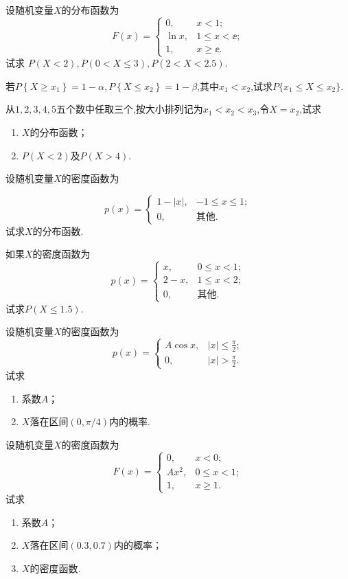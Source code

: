 \begin{xiti}
\item 设随机变量$X$的分布函数为
\[
  F(x) = \begin{cases}
    0, & x<1; \\
    \ln x, & 1 \leqslant x<\ee; \\
    1, & x \geqslant \ee.
  \end{cases}
\]
试求 $P(X<2), P(0<X \leqslant 3), P(2<X<2.5)$.

\item 若$P\left\{X \geqslant x_{1}\right\}=1-\alpha, P\left\{X \leqslant x_{2}\right\}=1-\beta$,其中$ x_1<x_2 $,试求$P \{ x_{1} \leqslant X \leqslant x_{2} \}$.

\item 从$ 1,2,3,4,5 $五个数中任取三个,按大小排列记为$ x_1<x_2<x_3 $,令$ X=x_2 $,试求
  \begin{enumerate}
    \item $X$的分布函数；
    \item $P(X<2)$及$P(X>4)$.
  \end{enumerate}

\item 设随机变量$X$的密度函数为

\[
  p(x) = \begin{cases}
    1-|x|, & -1 \leqslant x \leqslant 1; \\
    0, & \text{其他}.
  \end{cases}
\]
试求$X$的分布函数.

\item 如果$X$的密度函数为
\[
  p(x) = \begin{cases}
    x, & 0 \le x < 1 ; \\
    2 - x, & 1 \le x < 2; \\
    0, & \text{其他}.
  \end{cases}
\]
试求$P(X\le1.5)$.

\item 设随机变量$X$的密度函数为
\[
  p(x) = \begin{cases}
    A\cos x, & |x| \le \frac\pi2; \\
    0, & |x| > \frac\pi2.
  \end{cases}
\]
试求
\begin{enumerate}
  \item 系数$A$；
  \item $X$落在区间$(0,\pi/4)$内的概率.
\end{enumerate}

\item 设随机变量$ X $的密度函数为
\[
  F(x) = \begin{cases}
    0, & x<0; \\
    A x^{2}, & 0 \leqslant x<1; \\
    1, & x \geqslant 1.
  \end{cases}
\]
试求
  \begin{enumerate}
    \item 系数$ A $；
    \item $ X $落在区间$ (0.3,0.7) $内的概率；
    \item $ X $的密度函数.
  \end{enumerate}


\end{xiti}
